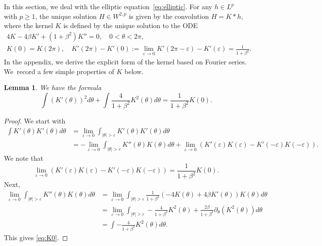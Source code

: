 \documentclass[JEP,XML,SOM,Unicode,NoFloatCountersInSection,published]{cedram}
\let\epsilon\varepsilon
\theoremstyle{plain}
\newtheorem{lemma}[theorem]{Lemma}
\theoremstyle{definition}
\let\rd\partial
\let\bt\beta
\let\tht\theta
\begin{document}
In this section, we deal with the elliptic equation~\eqref{eq:elliptic}. For any $h \in L^p$ with $p\ge1$, the unique solution $H \in W^{2,p}$ is given by the convolution $H=K*h$, where the kernel $K$ is defined by the unique solution to the ODE
\begin{equation}\label{eq:K}
\begin{split}
4K - 4\bt K' + (1+\bt^2)K'' = 0, \quad 0<\tht<2\pi, \\
K(0) = K(2\pi), \quad K'(2\pi)-K'(0) := \lim_{\epsilon\to 0}K'(2\pi-\epsilon)-K'(\epsilon)=\frac{1}{1+\beta^2}.
\end{split}
\end{equation}
In the appendix, we derive the explicit form of the kernel based on Fourier series. We~record a few simple properties of $K$ below.
\begin{lemma} We have the formula
\begin{equation}\label{eq:K0}
\int (K'(\tht))^2 d\tht + \int \frac{4}{1+\bt^2} K^2(\tht) d\tht = \frac{1}{1+\bt^2}K(0).
\end{equation}
\end{lemma}
\begin{proof} We start with
\begin{equation*}
\begin{split}
\int K'(\tht)K'(\tht) d\tht &= \lim_{\varepsilon\to0} \int_{ |\tht |>\varepsilon} K'(\tht)K'(\tht) d\tht \\
& = - \lim_{\varepsilon\to0} \int_{ |\tht |>\varepsilon} K''(\tht)K(\tht) d\tht + \lim_{\varepsilon\to0} (K'(\varepsilon)K(\varepsilon) - K'(-\varepsilon)K(-\varepsilon)).
\end{split}
\end{equation*}
We note that\vspace*{-3pt}
\begin{equation*}
\lim_{\varepsilon\to0} (K'(\varepsilon)K(\varepsilon) - K'(-\varepsilon)K(-\varepsilon)) = \frac{1}{1+\bt^2}K(0).
\end{equation*}
Next,\vspace*{-3pt}
\begin{equation*}
\begin{split}
\lim_{\varepsilon\to0} \int_{ |\tht |>\varepsilon} K''(\tht)K(\tht) d\tht &= \lim_{\varepsilon\to0} \int_{ |\tht |>\varepsilon} \frac{1}{1+\bt^2} \left(-4K(\tht) + 4\bt K'(\tht) \right)K(\tht) d\tht \\
& = \lim_{\varepsilon\to0} \int_{ |\tht |>\varepsilon} -\frac{4}{1+\bt^2} K^2(\tht) + \frac{2\bt}{1+\bt^2} \rd_\tht (K^2(\tht)) d\tht\\
&= \int -\frac{4}{1+\bt^2} K^2(\tht) d\tht.
\end{split}
\end{equation*}
This gives \eqref{eq:K0}.
\end{proof}
\end{document}
